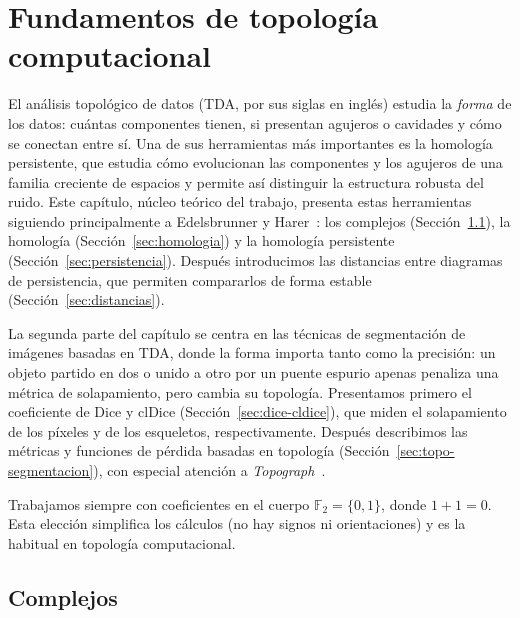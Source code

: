 
\chapter{Fundamentos de topología computacional}
\label{cap:fundamentos}

El análisis topológico de datos (TDA, por sus siglas en inglés) estudia
la \emph{forma} de los datos: cuántas componentes tienen, si presentan
agujeros o cavidades y cómo se conectan entre sí. Una de sus herramientas más importantes es la homología persistente, que
estudia cómo evolucionan las componentes y los agujeros de una familia
creciente de espacios y permite así distinguir la estructura robusta del
ruido. Este capítulo, núcleo teórico del trabajo,
presenta estas herramientas siguiendo principalmente a Edelsbrunner y
Harer~\cite{edelsbrunner2010}: los complejos
(Sección~\ref{sec:complejos}), la homología
(Sección~\ref{sec:homologia}) y la homología persistente
(Sección~\ref{sec:persistencia}). Después introducimos las distancias
entre diagramas de persistencia, que permiten compararlos de forma
estable (Sección~\ref{sec:distancias}).

La segunda parte del capítulo se centra en las técnicas de segmentación de imágenes basadas en TDA, donde la forma importa tanto como la precisión: un objeto
partido en dos o unido a otro por un puente espurio apenas penaliza una
métrica de solapamiento, pero cambia su topología. Presentamos primero el
coeficiente de Dice y clDice (Sección~\ref{sec:dice-cldice}), que miden
el solapamiento de los píxeles y de los esqueletos, respectivamente. Después
describimos las métricas y funciones de pérdida basadas en topología
(Sección~\ref{sec:topo-segmentacion}), con especial atención a
\emph{Topograph}~\cite{lux2025}.

Trabajamos siempre con coeficientes en el cuerpo $\mathbb{F}_2=\{0,1\}$,
donde $1+1=0$. Esta elección simplifica los cálculos (no hay signos ni
orientaciones) y es la habitual en topología computacional.

\section{Complejos}
\label{sec:complejos}

